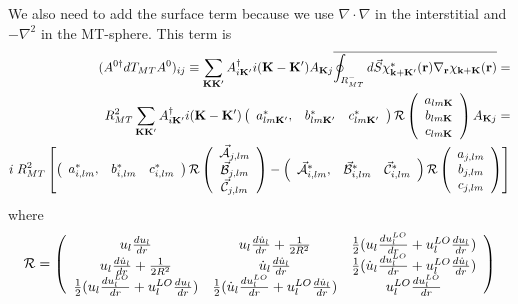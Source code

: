 \documentclass[aps,prb,floatfix,epsfig,singlecolumn,showpacs,preprintnumbers]{revtex4}
\renewcommand{\vr}{{\mathbf{r}}}
\newcommand{\vk}{{\mathbf{k}}}
\newcommand{\vK}{{\mathbf{K}}}
\newcommand{\cR}{{\cal R}}
\renewcommand{\Im}{\textrm{Im}}
\newcommand{\vcA}{\vec{\cal A}}
\newcommand{\vcB}{\vec{\cal B}}
\newcommand{\vcC}{\vec{\cal C}}
\begin{document}
We also need to add the surface term because we use
$\nabla\cdot\nabla$ in the interstitial and $-\nabla^2$ in the
MT-sphere. This term is
%
\begin{eqnarray}
(A^{0\dagger} dT_{MT} A^0)_{ij} \equiv
\sum_{\vK\vK'} A^{\dagger}_{i\vK'}  i(\vK-\vK')  A_{\vK j} \overline{\oint_{R_{MT}^-} d\vec{S}\chi^*_{\vk+\vK'}(\vr)\nabla_\vr \chi_{\vk+\vK}(\vr)}
=\\
R_{MT}^2\sum_{\vK\vK'} A^{\dagger}_{i\vK'}  i(\vK-\vK')  
\left(
\begin{array}{ccc}
a_{lm\vK'}^*, & b_{lm\vK'}^* & c^*_{lm\vK'}
\end{array}
\right)
\cR
\left(
\begin{array}{c}
a_{lm\vK}\\
b_{lm\vK}\\ 
c_{lm\vK}
\end{array}
\right) A_{\vK j} 
=\\
i\; R_{MT}^2 
\left[
\left(
\begin{array}{ccc}
a_{i,lm}^*, & b_{i,lm}^* & c^*_{i,lm}
\end{array}
\right)
\cR
\left(
\begin{array}{c}
\vcA_{j,lm}\\
\vcB_{j,lm}\\ 
\vcC_{j,lm}
\end{array}
\right)
-
\left(
\begin{array}{ccc}
\vcA_{i,lm}^*, & \vcB_{i,lm}^* & \vcC^*_{i,lm}
\end{array}
\right)
\cR
\left(
\begin{array}{c}
a_{j,lm}\\
b_{j,lm}\\ 
c_{j,lm}
\end{array}
\right)
\right]
\end{eqnarray}
where
\begin{eqnarray}
\cR=\left(
\begin{array}{ccc}
u_l\frac{du_l}{dr} & u_l\frac{d\dot{u}_l}{dr}+\frac{1}{2R^2} &\frac{1}{2}(u_l\frac{du^{LO}_l}{dr} +u^{LO}_l\frac{du_l}{dr}) \\
u_l\frac{d\dot{u}_l}{dr}+\frac{1}{2R^2} & \dot{u}_l\frac{d\dot{u}_l}{dr} &  \frac{1}{2}(\dot{u}_l\frac{du^{LO}_l}{dr} +u^{LO}_l\frac{d\dot{u}_l}{dr}) \\
\frac{1}{2}(u_l\frac{du^{LO}_l}{dr} +u^{LO}_l\frac{du_l}{dr})&\frac{1}{2}(\dot{u}_l\frac{du^{LO}_l}{dr}+u^{LO}_l\frac{d\dot{u}_l}{dr}) & u_l^{LO}\frac{d u^{LO}_l}{dr}
\end{array}
\right)
\end{eqnarray}
\end{document}
